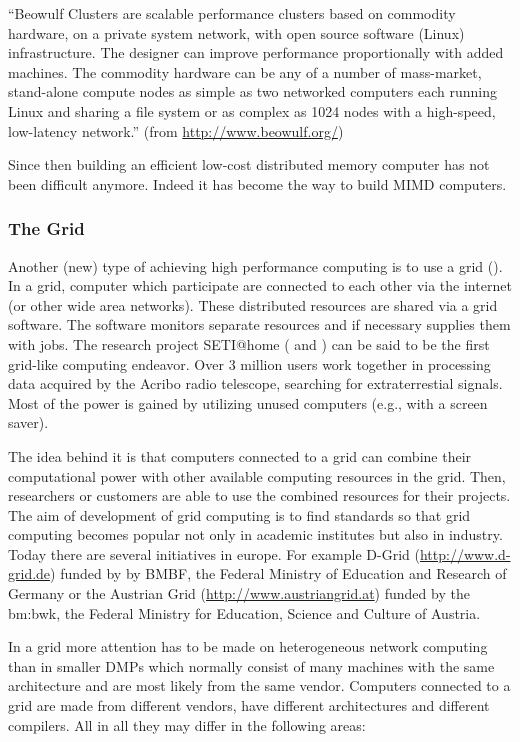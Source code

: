 ``Beowulf Clusters are scalable performance clusters based on commodity
hardware, on a private system network, with open source software
(Linux) infrastructure. The designer can improve performance
proportionally with added machines. The commodity hardware can be any
of a number of mass-market, stand-alone compute nodes as simple as two
networked computers each running Linux and sharing a file system or as
complex as 1024 nodes with a high-speed, low-latency network.'' (from
\url{http://www.beowulf.org/})

Since then building an efficient low-cost distributed memory computer
has not been difficult anymore. Indeed it has become the way to build
MIMD computers.

\subsubsection{The Grid}

Another (new) type of achieving high performance computing is to use a
grid (\cite{foster99gbf}). In a grid, computer which participate are
connected to each other
via the internet (or other wide area networks). These distributed
resources are shared via a 
grid software. The software monitors separate resources and if
necessary supplies them with jobs. The research project SETI@home
(\cite{korpela01shm} and \cite{anderson02she}) can
be said to be the first grid-like computing endeavor. Over 3 million
users work together in processing data acquired by the Acribo radio
telescope, searching for extraterrestial signals. Most of the power is
gained by utilizing unused computers (e.g., with a screen saver).

The idea behind it is that computers connected to a grid can combine
their computational power with other available computing resources in the
grid. Then, researchers or customers are able to use the combined
resources for their projects. The aim of development of grid computing
is to find standards so that grid computing becomes popular
not only in academic institutes but also in industry. Today
there are several initiatives in europe. For example D-Grid
(\url{http://www.d-grid.de}) funded
by by BMBF, the Federal Ministry of Education and Research of Germany
or the Austrian Grid (\url{http://www.austriangrid.at}) funded by the
bm:bwk, the Federal Ministry for Education, Science and Culture of
Austria.

In a grid more attention has to be made on heterogeneous network
computing than in smaller DMPs which normally consist of many machines
with the same architecture and are most likely from the same
vendor. Computers connected to a grid are made 
from different vendors, have different architectures and different
compilers. All in all they may differ in the following areas:

